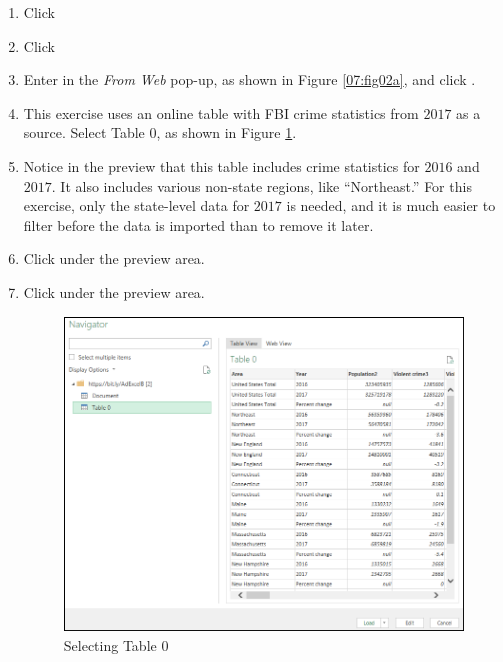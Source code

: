\begin{enumbox}
	\begin{enumerate}
		\item {} Click 
		\item {} Click 
		\item Enter  in the \textit{From Web} pop-up, as shown in Figure \ref{07:fig02a}, and click .
		\item This exercise uses an online table with FBI crime statistics from $ 2017 $ as a source. Select Table $ 0 $, as shown in Figure \ref{07:fig02d}.
		\item Notice in the preview that this table includes crime statistics for $ 2016 $ and $ 2017 $. It also includes various non-state regions, like ``Northeast.'' For this exercise, only the state-level data for $ 2017 $ is needed, and it is much easier to filter before the data is imported than to remove it later.
		\item {} Click  under the preview area.
		\item {} Click  under the preview area.

		\begin{figure}[H]
			\centering
			\includegraphics[width=\maxwidth{.95\linewidth}]{gfx/ch07_fig02d}
			\caption{Selecting Table 0}
			\label{07:fig02d}
		\end{figure}


\end{enumerate}
\end{enumbox}
